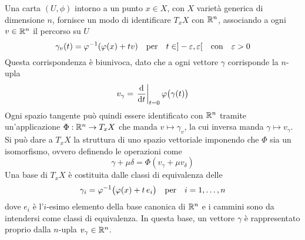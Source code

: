 Una carta $(U, \phi)$ intorno a un punto $x \in  X$, con $X$ varietà generica di dimensione $n$, fornisce un modo di identificare $T_x X$ con $\mathbb{R}^{n}$, associando a ogni $v \in \mathbb{R}^{n}$ il percorso su $U$ \begin{equation} \label{eq:tangentRn}
  \gamma_{v}(t) = \phi^{-1}(\phi(x)+tv) \qqtext{per} t \in ]-\epsilon, \epsilon[ \qqtext{con} \epsilon > 0
\end{equation} Questa corrispondenza è biunivoca, dato che a ogni vettore $\gamma$ corrisponde la $n$-upla \begin{equation*} \label{eq:tangentCoords}
v_{\gamma} = \eval{\dv{t}}_{t=0} \phi\big( \gamma(t)\big)
\end{equation*} Ogni spazio tangente può quindi essere identificato con $\mathbb{R}^{n}$ tramite un'applicazione $\Phi: \mathbb{R}^{n} \to T_x X$ che manda $v \mapsto \gamma_v$, la cui inversa manda $\gamma \mapsto v_{\gamma}$. Si può dare a $T_x X$ la struttura di uno spazio vettoriale imponendo che $\Phi$ sia un isomorfismo, ovvero definendo le operazioni come
\begin{equation*}
\gamma + \mu \delta = \Phi(v_\gamma + \mu v_{\delta})
\end{equation*}
Una base di $T_x X$ è costituita dalle classi di equivalenza delle  \begin{equation} \label{eq:tangentRnBase}
  \gamma_i = \phi^{-1}\big(\phi(x)+t\, e_i\big) \qqtext{per} i=1, \ldots, n
\end{equation}
dove $e_i$ è l'$i$-esimo elemento della base canonica di $\mathbb{R}^{n}$ e i cammini sono da intendersi come classi di equivalenza. In questa base, un vettore $\gamma$ è rappresentato proprio dalla $n$-upla $v_{\gamma} \in \mathbb{R}^{n}$.

